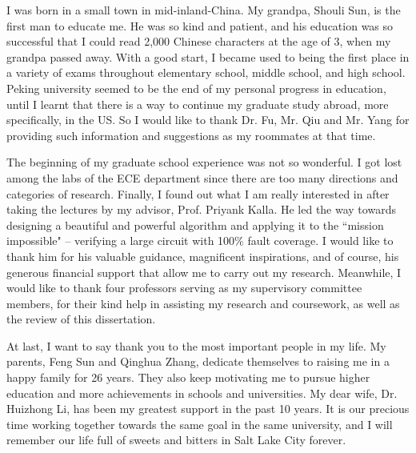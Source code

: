 ﻿I was born in a small town in mid-inland-China. My grandpa, Shouli Sun, 
is the first man to educate me. He was so kind and patient, and his education 
was so successful that I could read 2,000 Chinese characters at the age of 3, 
when my grandpa passed away. With a good start, I became used to being the 
first place in a variety of exams throughout elementary school, middle school, 
and high school. Peking university seemed to be the end of my personal 
progress in education, until I learnt that there is a way to continue my 
graduate study abroad, more specifically, in the US. So I would like to 
thank Dr. Fu, Mr. Qiu and Mr. Yang for providing such information and 
suggestions as my roommates at that time.

The beginning of my graduate school experience was not 
so wonderful. I got lost among the labs of the ECE department since there are 
too many directions and categories of research. Finally, I found out what
I am really interested in after taking the lectures by my advisor, 
Prof. Priyank Kalla. He led the way towards designing a beautiful and powerful
algorithm and applying it to the ``mission impossible" -- verifying
a large circuit with 100\% fault coverage. I would like to thank him for
his valuable guidance, magnificent inspirations, and of course, his generous 
financial support that allow me to carry out my research. Meanwhile, I would 
like to thank four professors serving as my supervisory committee members, 
for their kind help in assisting my research and coursework, as well as the 
review of this dissertation.

At last, I want to say thank you to the most important people in my life.
My parents, Feng Sun and Qinghua Zhang, dedicate themselves to raising me
in a happy family for 26 years. They also keep motivating me to pursue higher 
education and more achievements in schools and universities. My dear wife,
Dr. Huizhong Li, has been my greatest support in the past 10 years. It is our 
precious time working together towards the same goal in the same university, and 
I will remember our life full of sweets and bitters in Salt Lake
City forever.

